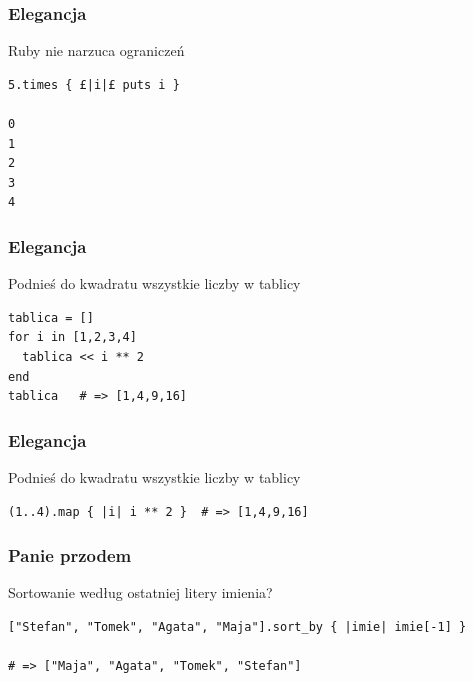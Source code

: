
\begin{frame}[fragile]
\frametitle{Elegancja}
\begin{block}{Ruby \bh{}nie\eh{} narzuca ograniczeń}
\begin{lstlisting}[style=Ruby]
5.times { £|i|£ puts i }

0
1
2
3
4
\end{lstlisting}
\end{block}
\end{frame}


\begin{frame}[fragile]
\frametitle{Elegancja}
\begin{block}{Podnieś do kwadratu wszystkie liczby w tablicy}
\begin{lstlisting}[style=Ruby]
tablica = []
for i in [1,2,3,4]
  tablica << i ** 2
end
tablica   # => [1,4,9,16]
\end{lstlisting}
\end{block}
\end{frame}

\begin{frame}[fragile]
\frametitle{Elegancja}
\begin{block}{Podnieś do kwadratu wszystkie liczby w tablicy}
\begin{lstlisting}[style=Ruby]
(1..4).map { |i| i ** 2 }  # => [1,4,9,16]
\end{lstlisting}
\end{block}
\end{frame}

\begin{frame}[fragile]
\frametitle{Panie przodem}
\begin{block}{Sortowanie według ostatniej litery imienia?}
\begin{lstlisting}[style=Ruby,basicstyle=\tiny\ttfamily]
["Stefan", "Tomek", "Agata", "Maja"].sort_by { |imie| imie[-1] }

# => ["Maja", "Agata", "Tomek", "Stefan"]
\end{lstlisting}
\end{block}
\end{frame}

\begin{frame}[plain]
\end{frame}

